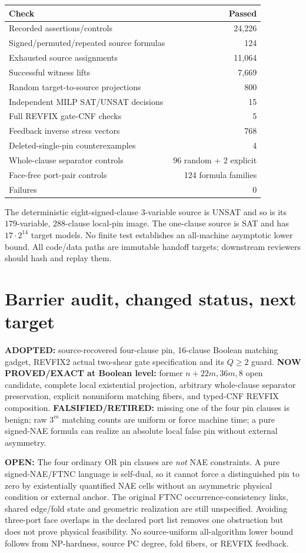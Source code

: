 \documentclass[11pt]{article}
\newcommand{\EXACT}{\textbf{PROVED/EXACT}}
\newcommand{\OPEN}{\textbf{OPEN}}
\newcommand{\RET}{\textbf{FALSIFIED/RETIRED}}
\begin{document}
\begin{center}\begin{tabular}{lr}\toprule
Check & Passed \\\midrule
Recorded assertions/controls & 24,226\\
Signed/permuted/repeated source formulas & 124\\
Exhausted source assignments & 11,064\\
Successful witness lifts & 7,669\\
Random target-to-source projections & 800\\
Independent MILP SAT/UNSAT decisions & 15\\
Full REVFIX gate-CNF checks & 5\\
Feedback inverse stress vectors & 768\\
Deleted-single-pin counterexamples & 4\\
Whole-clause separator controls & 96 random + 2 explicit\\
Face-free port-pair controls & 124 formula families\\
Failures & 0\\
\bottomrule\end{tabular}\end{center}

The deterministic eight-signed-clause 3-variable source is UNSAT and so is
its $179$-variable, $288$-clause local-pin image.  The one-clause source is
SAT and has $17\cdot2^{14}$ target models.  No finite test establishes
an all-machine asymptotic lower bound.  All code/data paths are immutable
handoff targets; downstream reviewers should hash and replay them.

\section{Barrier audit, changed status, next target}
\textbf{ADOPTED:} source-recovered four-clause pin, 16-clause Boolean matching
gadget, REVFIX2 actual two-shear gate specification and its $Q\ge2$ guard.
\textbf{NOW \EXACT{} at Boolean level:} former $n+22m,36m,8$ open candidate,
complete local existential projection, arbitrary whole-clause separator
preservation, explicit nonuniform matching fibers, and typed-CNF REVFIX
composition.  \textbf{\RET:} missing one of the four pin clauses is benign;
raw $3^m$ matching counts are uniform or force machine time; a pure signed-NAE
formula can realize an absolute local false pin without external asymmetry.

\textbf{\OPEN:} The four ordinary OR pin clauses are \emph{not} NAE
constraints.  A pure signed-NAE/FTNC language is self-dual, so it cannot
force a distinguished pin to zero by existentially quantified NAE cells
without an asymmetric physical condition or external anchor.  The original
FTNC occurrence-consistency links, shared edge/fold state and geometric
realization are still unspecified.  Avoiding three-port face overlaps in
the declared port list removes one obstruction but does not prove physical
feasibility.  No source-uniform all-algorithm lower bound follows from
NP-hardness, source PC degree, fold fibers, or REVFIX feedback.
\end{document}
